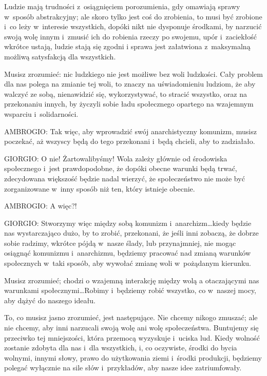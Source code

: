 \documentclass[oneside,polish,11pt,sfheadings]{mwbk}
\begin{document}
 
Ludzie mają trudności z~osiągnięciem porozumienia, gdy omawiają sprawy w~sposób abstrakcyjny; ale skoro tylko jest coś
do zrobienia, to musi być zrobione i~co leży w~interesie wszystkich, dopóki nikt nie dysponuje środkami, by narzucić
swoją wolę innym i~zmusić ich do robienia rzeczy po swojemu, upór i~zaciekłość wkrótce ustają, ludzie stają się zgodni
i sprawa jest załatwiona z~maksymalną możliwą satysfakcją dla wszystkich. 

 
Musisz zrozumieć: nic ludzkiego nie jest możliwe bez woli ludzkości. Cały problem dla nas polega na zmianie tej woli, to
znaczy na uświadomieniu ludziom, że aby walczyć ze sobą, nienawidzić się, wykorzystywać, to stracić wszystko, oraz na
przekonaniu innych, by życzyli sobie ładu społecznego opartego na wzajemnym wsparciu i~solidarności. 




 
\noindent AMBROGIO: Tak więc, aby wprowadzić swój anarchistyczny komunizm, musisz poczekać, aż wszyscy będą do tego przekonani i~będą chcieli, aby to zadziałało. 




 
\noindent GIORGIO: O nie! Żartowalibyśmy! Wola zależy głównie od środowiska społecznego i~jest prawdopodobne, że dopóki obecne
warunki będą trwać, zdecydowana większość będzie nadal wierzyć, że społeczeństwo nie może być zorganizowane w~inny
sposób niż ten, który istnieje obecnie. 




 
\noindent AMBROGIO: A więc?! 




 
\noindent GIORGIO: Stworzymy więc między sobą komunizm i~anarchizm\ldots kiedy będzie nas wystarczająco dużo, by to zrobić, przekonani,
że jeśli inni zobaczą, że dobrze sobie radzimy, wkrótce pójdą w~nasze ślady, lub przynajmniej, nie mogąc osiągnąć
komunizmu i~anarchizmu, będziemy pracować nad zmianą warunków społecznych w~taki sposób, aby wywołać zmianę woli w~pożądanym kierunku. 

 
Musisz zrozumieć; chodzi o wzajemną interakcję między wolą a otaczającymi nas warunkami społecznymi\ldots Robimy i~będziemy
robić wszystko, co w~naszej mocy, aby dążyć do naszego ideału. 

 
To, co musisz jasno zrozumieć, jest następujące. Nie chcemy nikogo zmuszać; ale nie chcemy, aby inni narzucali swoją wolę
ani wolę społeczeństwa. Buntujemy się przeciwko tej mniejszości, która przemocą wyzyskuje i~uciska lud. Kiedy wolność
zostanie zdobyta dla nas i~dla wszystkich, i, co oczywiste, środki do bycia wolnymi, innymi słowy, prawo do użytkowania
ziemi i~środki produkcji, będziemy polegać wyłącznie na sile słów i~przykładów, aby nasze idee zatriumfowały. 
\end{document}
